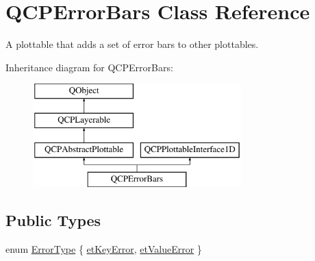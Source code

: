 \hypertarget{class_q_c_p_error_bars}{}\section{Q\+C\+P\+Error\+Bars Class Reference}
\label{class_q_c_p_error_bars}


A plottable that adds a set of error bars to other plottables.  


Inheritance diagram for Q\+C\+P\+Error\+Bars\+:\begin{figure}[H]
\begin{center}
\leavevmode
\includegraphics[height=4.000000cm]{class_q_c_p_error_bars}
\end{center}
\end{figure}
\subsection*{Public Types}
\begin{DoxyCompactItemize}
\item 
enum \hyperlink{class_q_c_p_error_bars_a95f0220f11a72648b96480a85ce26474}{Error\+Type} \{ \hyperlink{class_q_c_p_error_bars_a95f0220f11a72648b96480a85ce26474a9fca24d20d5376e41be216fc9b08cd21}{et\+Key\+Error}, 
\hyperlink{class_q_c_p_error_bars_a95f0220f11a72648b96480a85ce26474a5f760fc9c0a98c7f1e93e33bf54e9d83}{et\+Value\+Error}
 \}
\end{DoxyCompactItemize}

